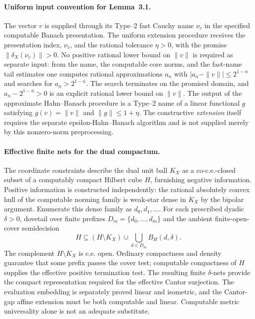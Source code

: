\paragraph{Uniform input convention for Lemma~3.1.}
The vector $v$ is supplied through its Type--2 fast Cauchy name
$\nu_v$ in the specified computable Banach presentation. The
uniform extension procedure receives the presentation index,
$\nu_v$, and the rational tolerance $\eta>0$, with the promise
$\|\delta_X(\nu_v)\|>0$. No positive rational lower bound on
$\|v\|$ is required as separate input: from the name, the computable
core norms, and the fast-name tail estimates one computes rational
approximations $a_n$ with
$|a_n-\|v\||\leq 2^{1-n}$ and searches for
$a_n>2^{1-n}$. The search terminates on the promised domain,
and $a_n-2^{1-n}>0$ is an explicit rational lower bound on
$\|v\|$. The output of the approximate Hahn--Banach procedure is
a Type--2 name of a linear functional $g$ satisfying
$g(v)=\|v\|$ and $\|g\|\leq 1+\eta$.
The constructive \emph{extension} itself requires the separate
epsilon-Hahn--Banach algorithm and is not supplied merely by this
nonzero-norm preprocessing.

\paragraph{Effective finite nets for the dual compactum.}
The coordinate constraints describe the dual unit ball $K_X$
as a co-c.e.-closed subset of a computably compact Hilbert cube
$H$, furnishing negative information. Positive information is
constructed independently: the rational absolutely convex hull
of the computable norming family is weak-star dense in $K_X$
by the bipolar argument. Enumerate this dense family as
$d_0,d_1,\ldots$. For each prescribed dyadic $\delta>0$,
dovetail over finite prefixes $D_m=\{d_0,\ldots,d_m\}$ and
the ambient finite-open-cover semidecision
\[
 H\subseteq (H\setminus K_X)
   \cup\bigcup_{d\in D_m} B_H(d,\delta).
\]
The complement $H\setminus K_X$ is c.e. open. Ordinary compactness
and density guarantee that some prefix passes the cover test;
computable compactness of $H$ supplies the effective positive
termination test. The resulting finite $\delta$-nets provide
the compact representation required for the effective Cantor
surjection. The evaluation embedding is separately proved
linear and isometric, and the Cantor-gap affine extension must
be both computable and linear. Computable metric universality
alone is not an adequate substitute.

